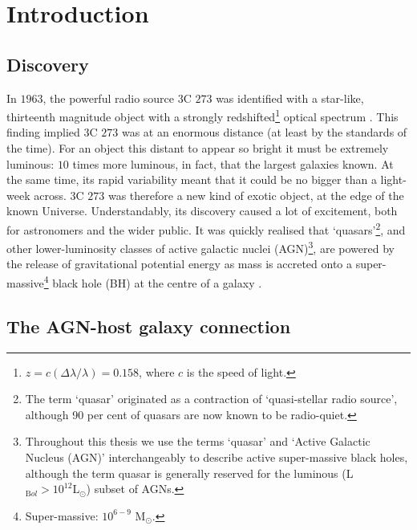 
\chapter{Introduction}
\label{ch:intro}

\section{Discovery}

In $1963$, the powerful radio source $3$C $273$ was identified with a star-like, thirteenth magnitude object with a strongly redshifted\footnote{$z=c(\Delta \lambda/\lambda)=0.158$, where $c$ is the speed of light.} optical spectrum \citep{schmidt63}. 
This finding implied $3$C $273$ was at an enormous distance (at least by the standards of the time). 
For an object this distant to appear so bright it must be extremely luminous: $10$ times more luminous, in fact, that the largest galaxies known. 
At the same time, its rapid variability meant that it could be no bigger than a light-week across.
$3$C $273$ was therefore a new kind of exotic object, at the edge of the known Universe.   
Understandably, its discovery caused a lot of excitement, both for astronomers and the wider public.
It was quickly realised that `quasars'\footnote{The term `quasar' originated as a contraction of `quasi-stellar radio source', although 90 per cent of quasars are now known to be radio-quiet.}, and other lower-luminosity classes of active galactic nuclei (AGN)\footnote{Throughout this thesis we use the terms `quasar' and `Active Galactic Nucleus (AGN)' interchangeably to describe active super-massive black holes, although the term quasar is generally reserved for the luminous (L$_{\mathrm Bol} > 10^{12}{\mathrm L}_{\odot}$) subset of AGNs.}, are powered by the release of gravitational potential energy as mass is accreted onto a super-massive\footnote{Super-massive: $10^{6 - 9}$ M$_\odot$.} black hole (BH) at the centre of a galaxy \citep[e.g.][]{hoyle63,salpeter64,lynden-bell69,lynden-bell71}. 

\section{The AGN-host galaxy connection}

